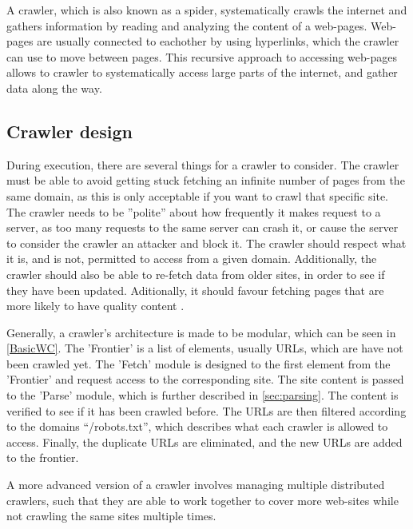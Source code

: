 A crawler, which is also known as a spider, systematically crawls the internet
and gathers information by reading and analyzing the content of a web-pages.
Web-pages are usually connected to eachother by using hyperlinks, which the
crawler can use to move between pages. This recursive approach to accessing
web-pages allows to crawler to systematically access large parts of the
internet, and gather data along the way.

\subsection{Crawler design}%
During execution, there are several things for a crawler to consider.
The crawler must be able to avoid getting stuck fetching an infinite number of
pages from the same domain, as this is only acceptable if you want to crawl that
specific site.
The crawler needs to be ''polite'' about how frequently it makes request to a
server, as too many requests to the same server can crash it, or cause the
server to consider the crawler an attacker and block it.
The crawler should respect what it is, and is not, permitted to access from a
given domain. Additionally, the crawler should also be able to re-fetch data
from older sites, in order to see if they have been updated. Aditionally, it
should favour fetching pages that are more likely to have quality content \citep[Ch.
20.1]{manning2008introduction}.\nl
 
Generally, a crawler's architecture is made to be modular, which can be seen in
\autoref{BasicWC}. The 'Frontier' is a list of elements, usually URLs, which are
have not been crawled yet. The 'Fetch' module is designed to the first element from
the 'Frontier' and request access to the corresponding site. The site content is
passed to the 'Parse' module, which is further described in
\autoref{sec:parsing}. The content is verified to see if it has been crawled
before. The URLs are then filtered according to the domains ``/robots.txt'',
which describes what each crawler is allowed to access. Finally, the duplicate
URLs are eliminated, and the new URLs are added to the frontier.\nl




A more advanced version of a crawler involves managing multiple distributed
crawlers, such that they are able to work together to cover more web-sites while
not crawling the same sites multiple times.


